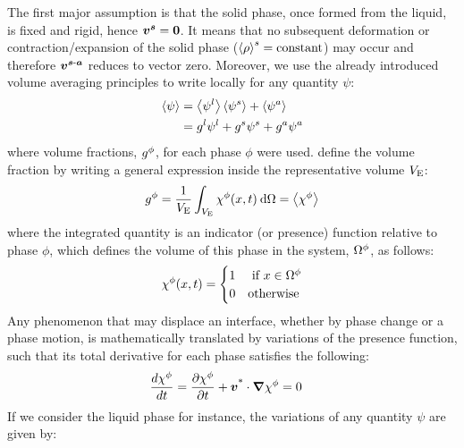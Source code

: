 The first major assumption is that the solid phase, once formed from the liquid, is fixed and rigid, hence $\boldsymbol{v^s}=\boldsymbol{0}$.
It means that no subsequent deformation or contraction/expansion of the solid phase ($\left \langle \rho \right \rangle^s=\text{constant}$) may occur and therefore $\boldsymbol{v^{s\text{-}a}}$ reduces to vector zero.
Moreover, we use the already introduced volume averaging principles to write locally for any quantity $\psi$:
\begin{subequations}
\begin{align}
\label{eq:}
\left \langle \psi \right \rangle &= \left \langle \psi^l \right \rangle \left \langle \psi^s \right \rangle + \left \langle \psi^a \right \rangle \\
			&= {g^l} \psi^l + {g^s} \psi^s  + {g^a} \psi^a
\end{align}
\end{subequations}
where volume fractions, ${g^{\phi}} $, for each phase $\phi$ were used. \citet{rappaz_numerical_2003} define
the volume fraction by writing a general expression inside the representative volume $V_\text{E}$:
\begin{align}
\label{eq:}
{g^{\phi}}  = \frac{1}{V_\text{E}} \int_{V_\text{E}} \chi^\phi(x,t)\: \mathrm{d}\Omega = \left \langle \chi^\phi \right \rangle
\end{align}
where the integrated quantity is an indicator (or presence) function relative to phase $\phi$, which
defines the volume of this phase in the system, $\Omega^\phi$, as follows:
\begin{align}
\label{eq:}
\chi^\phi(x,t)=
\begin{cases}
  1 	& \text{ if } x \in \Omega^\phi \\ 
  0 	& \text{otherwise}
\end{cases}
\end{align}
Any phenomenon that may displace an interface, whether by phase change or a phase motion, is 
mathematically translated by variations of the presence function, such that its total derivative for each phase
satisfies the following:
%
\begin{align}
\label{eq:transport_presence}
& \frac{d \chi^\phi}{dt} = \frac{\partial \chi^\phi}{\partial t}  + \boldsymbol{v^\text{*}} \cdot \boldsymbol{\nabla} \chi^\phi = 0
\end{align}
%
If we consider the liquid phase for instance, the variations of any quantity $\psi$ are given by:
